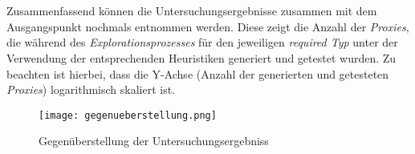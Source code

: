 \noindent
\\\\
Zusammenfassend können die Untersuchungsergebnisse zusammen mit dem Ausgangspunkt nochmals  entnommen werden. Diese zeigt die Anzahl der \emph{Proxies}, die während des \emph{Explorationsprozesses} für den jeweiligen \emph{required Typ} unter der Verwendung der entsprechenden \Gls{Heuristik}en generiert und getestet wurden. Zu beachten ist hierbei, dass die Y-Achse (Anzahl der generierten und getesteten \emph{Proxies}) logarithmisch skaliert ist.
\begin{sidewaysfigure}[ht]
    \texttt{[image: gegenueberstellung.png]}
    \caption{Gegenüberstellung der Untersuchungsergebniss}
    \label{abb:gegenueberstellung}
\end{sidewaysfigure}
